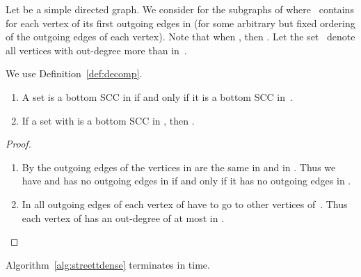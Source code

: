 \documentclass[11pt,letterpaper]{article}
\newcommand{\lu}{\textup{(}}
\newcommand{\ru}{\textup{)}\xspace}
\newcommand{\upbr}[1]{\lu #1\ru}
\begin{document}
\begin{definition}\label{def:decomp}
Let  be a simple directed graph. We consider for  
the subgraphs  of  where~ contains for 
each vertex of  its first  outgoing edges in  \upbr{for some arbitrary but
fixed ordering of the outgoing edges of each vertex}. Note that when
, then .
Let the set~ denote all vertices with out-degree more than  in~.
\end{definition}

\begin{lemma}\label{lem:decomp}
We use Definition~\ref{def:decomp}.
\begin{enumerate}
	\item A set  is a bottom SCC in 
	if and only if it is a bottom SCC in~.
	\item If a set  with 
	is a bottom SCC in , then .
\end{enumerate}
\end{lemma}
\begin{proof}
\begin{enumerate}
	\item
	By  the outgoing edges of the vertices in 
	are the same in  and in . Thus we have 
	and  has no outgoing edges in  if and only if it has no outgoing 
	edges in .
	\item
	In  all outgoing edges of each vertex of  have to go to other vertices 
	of~. Thus each vertex of  has an 
	out-degree of at most  in .\qedhere
\end{enumerate}
\end{proof}

\begin{proposition}
		Algorithm~\ref{alg:streettdense} terminates in  time.
\end{proposition}
\end{document}

